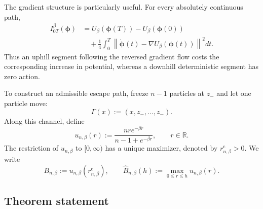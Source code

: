 \documentclass{article}
\theoremstyle{plain}
\theoremstyle{definition}
\theoremstyle{remark}
\begin{document}
The gradient structure is particularly useful. For every absolutely continuous path,
\begin{equation}
\begin{aligned}
    I_{0T}^\beta(\boldsymbol\phi)
    &=
    U_\beta(\boldsymbol\phi(T))
    -
    U_\beta(\boldsymbol\phi(0))
    \\
    &\quad+
    \frac14\int_0^T
    \left\|
        \dot{\boldsymbol\phi}(t)
        -
        \nabla U_\beta(\boldsymbol\phi(t))
    \right\|^2dt.
\end{aligned}
\label{eq:gradient-action-decomposition}
\end{equation}
Thus an uphill segment following the reversed gradient flow costs the corresponding increase in potential, whereas a downhill deterministic segment has zero action.

To construct an admissible escape path, freeze \(n-1\) particles at \(z_-\) and let one particle move:
\begin{equation}
    \Gamma(x):=(x,z_-,\ldots,z_-).
    \label{eq:frozen-background-channel}
\end{equation}
Along this channel, define
\begin{equation}
    u_{n,\beta}(r)
    :=
    \frac{nr e^{-\beta r}}{n-1+e^{-\beta r}},
    \qquad r\in\mathbb R.
    \label{eq:reduced-softmin-potential}
\end{equation}
The restriction of \(u_{n,\beta}\) to \([0,\infty)\) has a unique maximizer, denoted by
\(r_{n,\beta}^{\mathrm c}>0\). We write
\begin{equation}
    B_{n,\beta}
    :=
    u_{n,\beta}(r_{n,\beta}^{\mathrm c}),
    \qquad
    \widehat B_{n,\beta}(h)
    :=
    \max_{0\le r\le h}u_{n,\beta}(r).
    \label{eq:softmin-channel-barriers}
\end{equation}

\subsection{Theorem statement}
\end{document}
